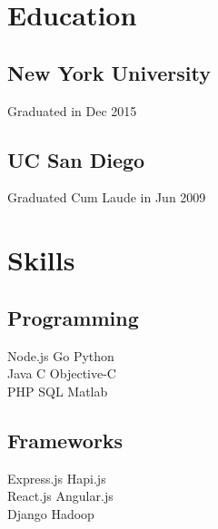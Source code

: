 \documentclass[letterpaper]{deedy-resume} %
\begin{document}
\begin{minipage}[t]{0.33\textwidth} %


\section{Education} 

\subsection{New York University}

Graduated in Dec 2015

\sectionspace %


\subsection{UC San Diego}

Graduated Cum Laude in Jun 2009

\sectionspace %


\section{Skills}
\subsection{Programming}
Node.js \textbullet{} 
Go \textbullet{}
Python \\
Java \textbullet{}  
C \textbullet{}
Objective-C \\
PHP \textbullet{}
SQL \textbullet{}
Matlab
\sectionspace
\subsection{Frameworks}
Express.js \textbullet{}
Hapi.js \\
React.js \textbullet{}
Angular.js \\
Django \textbullet{}
Hadoop
\sectionspace

\end{minipage}
\end{document}
